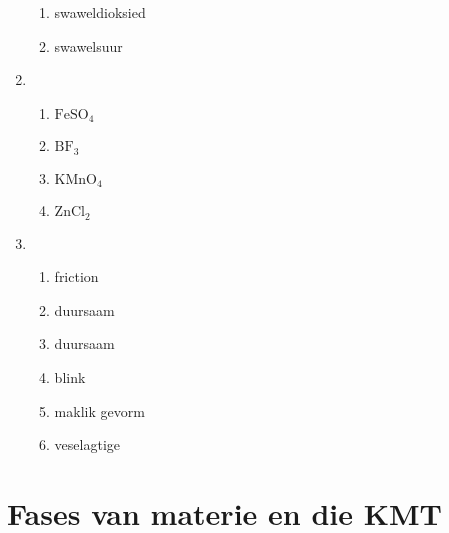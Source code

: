 \begin{multicols}{3}
\begin{enumerate}[itemsep=5pt, label=\textbf{\arabic*}. ]
\begin{enumerate}[itemsep=5pt,label=\textbf{(\alph*)}]
 \item swaweldioksied
 \item swawelsuur
\end{enumerate}
\item %
\begin{enumerate}[itemsep=5pt,label=\textbf{(\alph*)}]
 \item $\text{FeSO}_{4}$
 \item $\text{BF}_{3}$
 \item $\text{KMnO}_{4}$
 \item $\text{ZnCl}_{2}$
\end{enumerate}
\item %
\begin{enumerate}[itemsep=5pt,label=\textbf{(\alph*)}]
 \item friction
 \item duursaam
 \item duursaam
 \item blink
 \item maklik gevorm
 \item veselagtige
\end{enumerate}
\end{enumerate}
\end{multicols}

\section{Fases van materie en die KMT}
